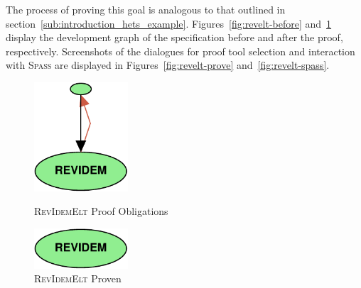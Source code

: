 \documentclass[11pt]{article}
\newcommand{\Spass}{\textsc{Spass}}
\begin{document}
The process of proving this goal is analogous to that outlined in section~\ref{sub:introduction_hets_example}. Figures~\ref{fig:revelt-before} and~\ref{fig:revelt-after} display the development graph of the specification before and after the proof, respectively. Screenshots of the dialogues for proof tool selection and interaction with \Spass{} are displayed in Figures~\ref{fig:revelt-prove} and~\ref{fig:revelt-spass}.

\clearpage

\begin{figure}
  \begin{minipage}[b]{0.5\textwidth}
    \begin{centering}
      \includegraphics[width=3.5cm]{RevElt-before.pdf}
      \caption{\textsc{RevIdemElt} Proof Obligations}\label{fig:revelt-before}
    \end{centering}
  \end{minipage}
  \begin{minipage}[b]{0.5\textwidth}
    \begin{centering}
	    \includegraphics[width=3.5cm]{RevElt-after.pdf}
	    \caption{\textsc{RevIdemElt} Proven}\label{fig:revelt-after}
    \end{centering}
  \end{minipage}
\end{figure}
\end{document}
